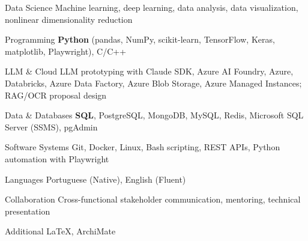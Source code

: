 
\begin{cvskills}
  \cvskill
    {Data Science}
    {Machine learning, deep learning, data analysis, data visualization, nonlinear dimensionality reduction}

  \cvskill
    {Programming}
    {\textbf{Python} (pandas, NumPy, scikit-learn, TensorFlow, Keras, matplotlib, Playwright), C/C++}

  \cvskill
    {LLM \& Cloud}
    {LLM prototyping with Claude SDK, Azure AI Foundry, Azure, Databricks, Azure Data Factory, Azure Blob Storage, Azure Managed Instances; RAG/OCR proposal design}

  \cvskill
    {Data \& Databases}
    {\textbf{SQL}, PostgreSQL, MongoDB, MySQL, Redis, Microsoft SQL Server (SSMS), pgAdmin}

  \cvskill
    {Software Systems}
    {Git, Docker, Linux, Bash scripting, REST APIs, Python automation with Playwright}

  \cvskill
    {Languages}
    {Portuguese (Native), English (Fluent)}

  \cvskill
    {Collaboration}
    {Cross-functional stakeholder communication, mentoring, technical presentation}

  \cvskill
    {Additional}
    {LaTeX, ArchiMate}
\end{cvskills}